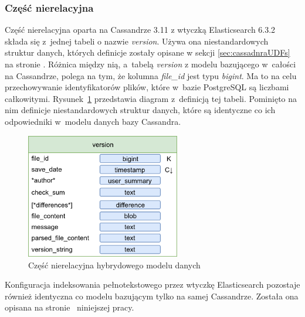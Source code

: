 \subsubsection{Część nierelacyjna}

Część nierelacyjna oparta na Cassandrze 3.11 z wtyczką Elasticsearch 6.3.2 składa się z~jednej tabeli o nazwie \textit{version}.
Używa ona niestandardowych struktur danych, których definicje zostały opisane w sekcji \ref{sec:cassadnraUDFs} na stronie \pageref{sec:cassadnraUDFs}.
Różnica między nią, a~tabelą \textit{version} z modelu bazującego w~całości na Cassandrze, polega na tym, że kolumna \textit{file\_id} jest typu \textit{bigint}.
Ma to na celu przechowywanie identyfikatorów plików, które w~bazie PostgreSQL są liczbami całkowitymi.
Rysunek~\ref{fig:hybridCassandraPart} przedstawia diagram z~definicją tej tabeli.
Pominięto na nim definicje niestandardowych struktur danych, które są identyczne co ich odpowiedniki w~modelu danych bazy Cassandra.

\begin{figure}[!ht]
\centering
\includegraphics[width=0.6\textwidth]{figures/hybrid_cassandra_model.png}
\caption{Część nierelacyjna hybrydowego modelu danych}
\label{fig:hybridCassandraPart}
\end{figure}

Konfiguracja indeksowania pełnotekstowego przez wtyczkę Elasticsearch pozostaje również identyczna co modelu bazującym tylko na samej Cassandrze. 
Została ona opisana na stronie~\pageref{sec:cassandraTextIndexConfig} niniejszej pracy.
